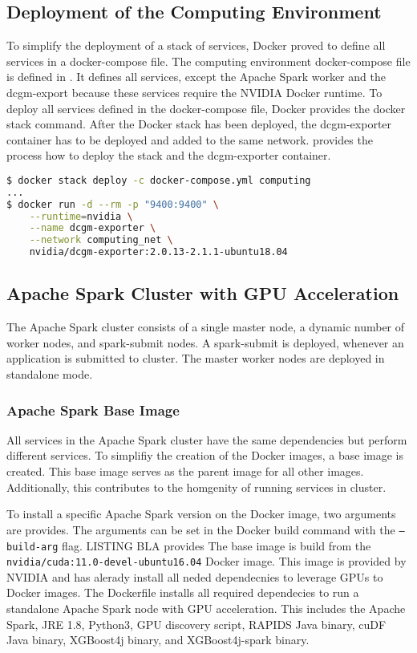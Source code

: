 \subsection{Deployment of the Computing Environment}
%
To simplify the deployment of a stack of services, Docker proved to define all services in a docker-compose file.
% 
The computing environment docker-compose file is defined in .
%
It defines all services, except the Apache Spark worker and the dcgm-export because these services require the NVIDIA Docker runtime.
%
To deploy all services defined in the docker-compose file, Docker provides the docker stack command.
%
After the Docker stack has been deployed, the dcgm-exporter container has to be deployed and added to the same network.
%
 provides the process how to deploy the stack and the dcgm-exporter container.
\begin{lstlisting}[label=lst:06_env_depl_docker-stack, caption=Auto-Scaler start command, language=sh]
$ docker stack deploy -c docker-compose.yml computing
...
$ docker run -d --rm -p "9400:9400" \
    --runtime=nvidia \
    --name dcgm-exporter \
    --network computing_net \
    nvidia/dcgm-exporter:2.0.13-2.1.1-ubuntu18.04
\end{lstlisting}


\subsection{Apache Spark Cluster with GPU Acceleration}
The Apache Spark cluster consists of a single master node, a dynamic number of worker nodes, and spark-submit nodes.
A spark-submit is deployed, whenever an application is submitted to cluster.
The master worker nodes are deployed in standalone mode.


\subsubsection{Apache Spark Base Image}
All services in the Apache Spark cluster have the same dependencies but perform different services. To simplifiy the creation of the Docker images, a base image is created. This base image serves as the parent image for all other images.
Additionally, this contributes to the homgenity of running services in cluster.


%
To install a specific Apache Spark version on the Docker image, two arguments are provides. The arguments can be set in the Docker build command with the \texttt{--build-arg} flag. LISTING BLA provides 
%
The base image is build from the \texttt{nvidia/cuda:11.0-devel-ubuntu16.04} Docker image. This image is provided by NVIDIA and has alerady install all neded dependecnies to leverage GPUs to Docker images.
%
The Dockerfile installs all required dependecies to run a standalone Apache Spark node with GPU acceleration. This includes the Apache Spark, JRE 1.8, Python3, GPU discovery script, RAPIDS Java binary, cuDF Java binary, XGBoost4j binary, and XGBoost4j-spark binary.


